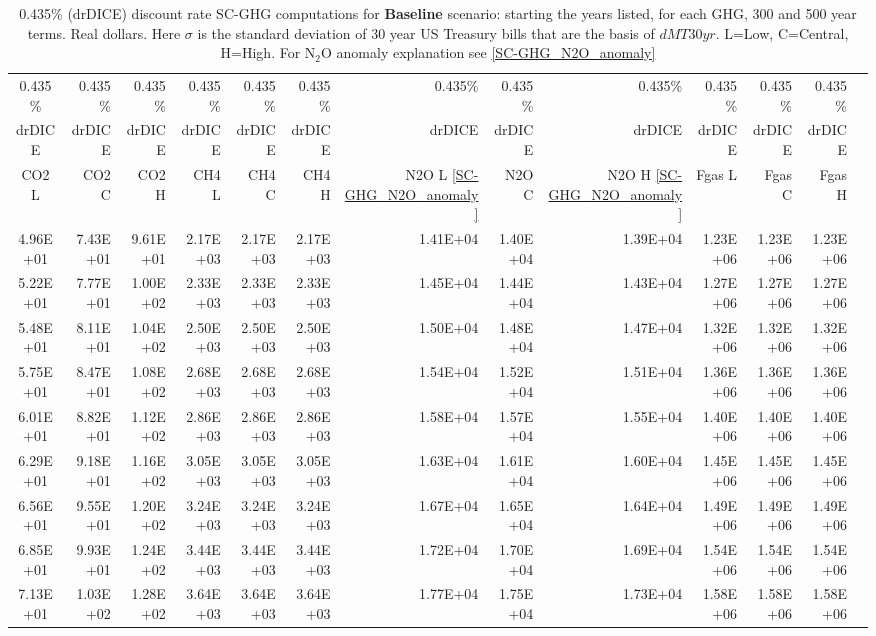 \documentclass{article}
\begin{document}
\begin{table}
   \caption{0.435\% (drDICE) discount rate  SC-GHG computations for \textbf{Baseline} scenario: starting the years listed, for each GHG, 300 and 500 year terms. Real dollars. Here $\sigma$ is the standard deviation of 30 year US Treasury bills that are the basis of $dMT30yr$. L=Low, C=Central, H=High. For N$_2$O anomaly explanation see \ref{SC-GHG_N2O_anomaly}} 
\label{PVs_300_yearSCC_B0.435}
\small
\begin{tabular}{crrr|rrr|rrr|rrr}
0.435\%  & 0.435\%  & 0.435\%  & 0.435\%  & 0.435\%  & 0.435\%  & 0.435\%  & 0.435\%  & 0.435\%  & 0.435\%  & 0.435\%  & 0.435\%  \\
drDICE   & drDICE   & drDICE   & drDICE   & drDICE   & drDICE   & drDICE   & drDICE   & drDICE   & drDICE   & drDICE   & drDICE   \\
CO2 L    & CO2 C    & CO2 H    & CH4 L    & CH4 C    & CH4 H    & N2O L \ref{SC-GHG_N2O_anomaly}     & N2O C      & N2O H \ref{SC-GHG_N2O_anomaly}    & Fgas L   & Fgas C   & Fgas H   \\
4.96E+01 & 7.43E+01 & 9.61E+01 & 2.17E+03 & 2.17E+03 & 2.17E+03 & 1.41E+04 & 1.40E+04 & 1.39E+04 & 1.23E+06 & 1.23E+06 & 1.23E+06 \\
5.22E+01 & 7.77E+01 & 1.00E+02 & 2.33E+03 & 2.33E+03 & 2.33E+03 & 1.45E+04 & 1.44E+04 & 1.43E+04 & 1.27E+06 & 1.27E+06 & 1.27E+06 \\
5.48E+01 & 8.11E+01 & 1.04E+02 & 2.50E+03 & 2.50E+03 & 2.50E+03 & 1.50E+04 & 1.48E+04 & 1.47E+04 & 1.32E+06 & 1.32E+06 & 1.32E+06 \\
5.75E+01 & 8.47E+01 & 1.08E+02 & 2.68E+03 & 2.68E+03 & 2.68E+03 & 1.54E+04 & 1.52E+04 & 1.51E+04 & 1.36E+06 & 1.36E+06 & 1.36E+06 \\
6.01E+01 & 8.82E+01 & 1.12E+02 & 2.86E+03 & 2.86E+03 & 2.86E+03 & 1.58E+04 & 1.57E+04 & 1.55E+04 & 1.40E+06 & 1.40E+06 & 1.40E+06 \\
6.29E+01 & 9.18E+01 & 1.16E+02 & 3.05E+03 & 3.05E+03 & 3.05E+03 & 1.63E+04 & 1.61E+04 & 1.60E+04 & 1.45E+06 & 1.45E+06 & 1.45E+06 \\
6.56E+01 & 9.55E+01 & 1.20E+02 & 3.24E+03 & 3.24E+03 & 3.24E+03 & 1.67E+04 & 1.65E+04 & 1.64E+04 & 1.49E+06 & 1.49E+06 & 1.49E+06 \\
6.85E+01 & 9.93E+01 & 1.24E+02 & 3.44E+03 & 3.44E+03 & 3.44E+03 & 1.72E+04 & 1.70E+04 & 1.69E+04 & 1.54E+06 & 1.54E+06 & 1.54E+06 \\
7.13E+01 & 1.03E+02 & 1.28E+02 & 3.64E+03 & 3.64E+03 & 3.64E+03 & 1.77E+04 & 1.75E+04 & 1.73E+04 & 1.58E+06 & 1.58E+06 & 1.58E+06 \\

\end{tabular}
\end{table}
\end{document}
